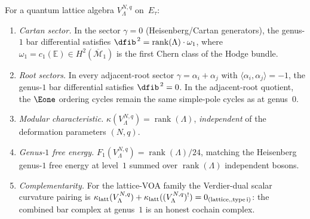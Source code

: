 \begin{theorem}\label{thm:lattice:curvature-braiding-orthogonal}
For a quantum lattice algebra $V_\Lambda^{N,q}$ on~$E_\tau$:
\begin{enumerate}[label=\textup{(\roman*)}]
\item \emph{Cartan sector.}
 In the sector $\gamma = 0$ (Heisenberg/Cartan generators), the genus-$1$
 bar differential satisfies
 $\dfib^{\,2} = \operatorname{rank}(\Lambda) \cdot \omega_1$,
 where $\omega_1 = c_1(\mathbb{E}) \in H^2(\overline{\mathcal{M}}_1)$
 is the first Chern class of the Hodge bundle.
\item \emph{Root sectors.}
 In every adjacent-root sector
 $\gamma = \alpha_i + \alpha_j$ with $\langle\alpha_i,\alpha_j\rangle = -1$,
 the genus-$1$ bar differential satisfies $\dfib^{\,2} = 0$.
 In the adjacent-root quotient, the $\Eone$ ordering cycles remain the
 same simple-pole cycles as at genus~$0$.
\item \emph{Modular characteristic.}
 $\kappa(V_\Lambda^{N,q}) = \operatorname{rank}(\Lambda)$,
 \emph{independent} of the deformation parameters $(N,q)$.
\item \emph{Genus-$1$ free energy.}
 $F_1(V_\Lambda^{N,q}) = \operatorname{rank}(\Lambda)/24$,
 matching the Heisenberg genus-$1$ free energy at level~$1$
 summed over $\operatorname{rank}(\Lambda)$ independent bosons.
\item \emph{Complementarity.} For the lattice-VOA family the
Verdier-dual scalar curvature pairing is
 $\kappa_{\mathrm{latt}}(V_\Lambda^{N,q}) +
 \kappa_{\mathrm{latt}}((V_\Lambda^{N,q})^!) =
 0_{\text{(lattice,\\,type\,i)}}$:
 the combined bar complex at genus~$1$ is an honest cochain complex.
\end{enumerate}
\end{theorem}
